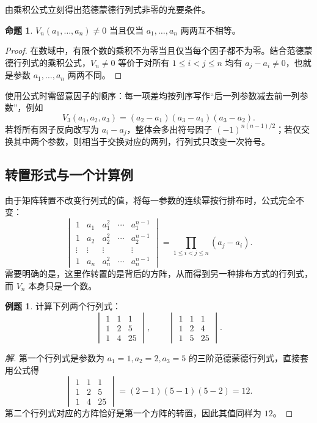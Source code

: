\documentclass[UTF8, fontset=fandol, a4paper, 12pt]{ctexart}
\theoremstyle{definition}
\newtheorem{proposition}[definition]{命题}
\newtheorem{example}[definition]{例题}
\begin{document}
由乘积公式立刻得出范德蒙德行列式非零的充要条件。

\begin{proposition}
$V_n(a_1,\ldots,a_n)\ne0$ 当且仅当 $a_1,\ldots,a_n$ 两两互不相等。
\end{proposition}
\begin{proof}
在数域中，有限个数的乘积不为零当且仅当每个因子都不为零。结合范德蒙德行列式的乘积公式，$V_n\ne0$ 等价于对所有 $1\le i<j\le n$ 均有 $a_j-a_i\ne0$，也就是参数 $a_1,\ldots,a_n$ 两两不同。
\end{proof}

使用公式时需留意因子的顺序：每一项差均按列序写作“后一列参数减去前一列参数”，例如
\[
 V_3(a_1,a_2,a_3)=(a_2-a_1)(a_3-a_1)(a_3-a_2).
\]
若将所有因子反向改写为 $a_i-a_j$，整体会多出符号因子 $(-1)^{n(n-1)/2}$；若仅交换其中两个参数，则相当于交换对应的两列，行列式只改变一次符号。

\subsection{转置形式与一个计算例}

由于矩阵转置不改变行列式的值，将每一参数的连续幂按行排布时，公式完全不变：
\[
 \begin{vmatrix}
 1&a_1&a_1^2&\cdots&a_1^{n-1}\\
 1&a_2&a_2^2&\cdots&a_2^{n-1}\\
 \vdots&\vdots&\vdots&&\vdots\\
 1&a_n&a_n^2&\cdots&a_n^{n-1}
 \end{vmatrix}
 =\prod_{1\le i<j\le n}(a_j-a_i).
\]
需要明确的是，这里作转置的是背后的方阵，从而得到另一种排布方式的行列式，而 $V_n$ 本身只是一个数。

\begin{example}
计算下列两个行列式：
\[
 \begin{vmatrix}1&1&1\\1&2&5\\1&4&25\end{vmatrix},
 \qquad
 \begin{vmatrix}1&1&1\\1&2&4\\1&5&25\end{vmatrix}.
\]
\end{example}
\begin{proof}[解]
第一个行列式是参数为 $a_1=1,a_2=2,a_3=5$ 的三阶范德蒙德行列式，直接套用公式得
\[
 \begin{vmatrix}1&1&1\\1&2&5\\1&4&25\end{vmatrix}
 =(2-1)(5-1)(5-2)=12.
\]
第二个行列式对应的方阵恰好是第一个方阵的转置，因此其值同样为 $12$。
\end{proof}
\end{document}
